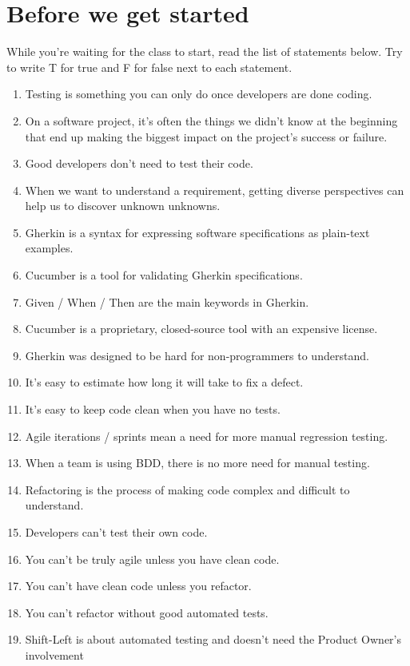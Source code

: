 \chapter*{Before we get started}

While you're waiting for the class to start, read the list of statements below. Try to write T for true and F for false next to each statement.

\begin{enumerate}
\item Testing is something you can only do once developers are done coding.
\item On a software project, it's often the things we didn't know at the beginning that end up making the biggest impact on the project's success or failure.
\item Good developers don't need to test their code.
\item When we want to understand a requirement, getting diverse perspectives can help us to discover unknown unknowns.
\item Gherkin is a syntax for expressing software specifications as plain-text examples.
\item Cucumber is a tool for validating Gherkin specifications.
\item Given / When / Then are the main keywords in Gherkin.
\item Cucumber is a proprietary, closed-source tool with an expensive license.
\item Gherkin was designed to be hard for non-programmers to understand.
\item It's easy to estimate how long it will take to fix a defect.
\item It's easy to keep code clean when you have no tests.
\item Agile iterations / sprints mean a need for more manual regression testing.
\item When a team is using BDD, there is no more need for manual testing.
\item Refactoring is the process of making code complex and difficult to understand.
\item Developers can't test their own code.
\item You can't be truly agile unless you have clean code.
\item You can't have clean code unless you refactor.
\item You can't refactor without good automated tests.
\item Shift-Left is about automated testing and doesn't need the Product Owner's involvement

\end{enumerate}
